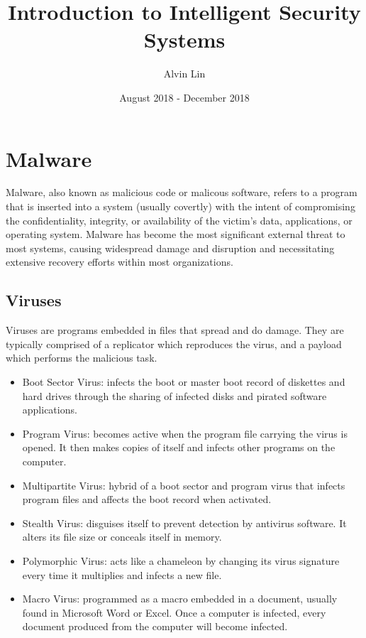 \documentclass{math}
\title{Introduction to Intelligent Security Systems}
\author{Alvin Lin}
\date{August 2018 - December 2018}
\begin{document}
\maketitle

\section*{Malware}
Malware, also known as malicious code or malicous software, refers to a program
that is inserted into a system (usually covertly) with the intent of
compromising the confidentiality, integrity, or availability of the victim's
data, applications, or operating system. Malware has become the most
significant external threat to most systems, causing widespread damage and
disruption and necessitating extensive recovery efforts within most
organizations.

\subsection*{Viruses}
Viruses are programs embedded in files that spread and do damage. They are
typically comprised of a replicator which reproduces the virus, and a payload
which performs the malicious task.
\begin{itemize}
  \item Boot Sector Virus: infects the boot or master boot record of diskettes
    and hard drives through the sharing of infected disks and pirated software
    applications.
  \item Program Virus: becomes active when the program file carrying the virus
    is opened. It then makes copies of itself and infects other programs on the
    computer.
  \item Multipartite Virus: hybrid of a boot sector and program virus that
    infects program files and affects the boot record when activated.
  \item Stealth Virus: disguises itself to prevent detection by antivirus
    software. It alters its file size or conceals itself in memory.
  \item Polymorphic Virus: acts like a chameleon by changing its virus signature
    every time it multiplies and infects a new file.
  \item Macro Virus: programmed as a macro embedded in a document, usually found
    in Microsoft Word or Excel. Once a computer is infected, every document
    produced from the computer will become infected.
\end{itemize}
\end{document}
